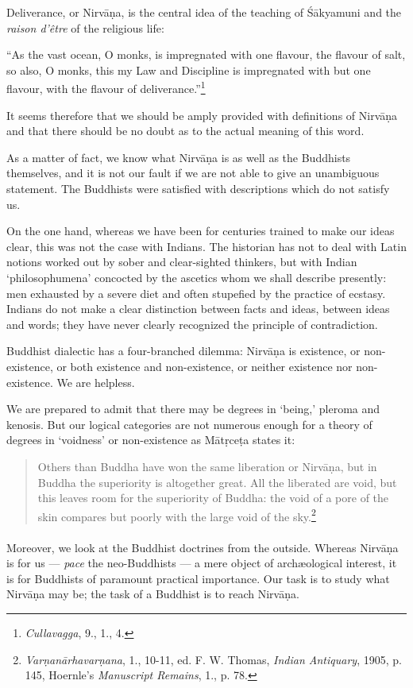 \documentclass[a4paper, 11pt, oneside, english, landscape]{article}
\begin{document}
Deliverance, or Nirvāṇa, is the central idea of the teaching of Śākyamuni and the \emph{raison d'être} of the religious life:

``As the vast ocean, O monks, is impregnated with one flavour, the flavour of salt, so also, O monks, this my Law and Discipline is impregnated with but one flavour, with the flavour of deliverance.''\footnote{\emph{Cullavagga}, 9., 1., 4.}

It seems therefore that we should be amply provided with definitions of Nirvāṇa and that there should be no doubt as to the actual meaning of this word.

As a matter of fact, we know what Nirvāṇa is as well as the Buddhists themselves, and it is not our fault if we are not able to give an unambiguous statement. The Buddhists were satisfied with descriptions which do not satisfy us.

On the one hand, whereas we have been for centuries trained to make our ideas clear, this was not the case with Indians. The historian has not to deal with Latin notions worked out by sober and clear-sighted thinkers, but with Indian `philosophumena' concocted by the ascetics whom we shall describe presently: men exhausted by a severe diet and often stupefied by the practice of ecstasy. Indians do not make a clear distinction between facts and ideas, between ideas and words; they have never clearly recognized the principle of contradiction.

Buddhist dialectic has a four-branched dilemma: Nirvāṇa is existence, or non-existence, or both existence and non-existence, or neither existence nor non-existence. We are helpless.

We are prepared to admit that there may be degrees in `being,' pleroma and kenosis. But our logical categories are not numerous enough for a theory of degrees in `voidness' or non-existence as Mātṛceṭa states it:
\begin{quotation}
\small
Others than Buddha have won the same liberation or Nirvāṇa, but in Buddha the superiority is altogether great. All the liberated are void, but this leaves room for the superiority of Buddha: the void of a pore of the skin compares but poorly with the large void of the sky.\footnote{\emph{Varṇanārhavarṇana}, 1., 10-11, ed. F. W. Thomas, \emph{Indian Antiquary}, 1905, p. 145, Hoernle's \emph{Manuscript Remains}, 1., p. 78.}
\end{quotation}
\paragraph{}
Moreover, we look at the Buddhist doctrines from the outside. Whereas Nirvāṇa is for us --- \emph{pace} the neo-Buddhists --- a mere object of archæological interest, it is for Buddhists of paramount practical importance. Our task is to study what Nirvāṇa may be; the task of a Buddhist is to reach Nirvāṇa.
\end{document}
